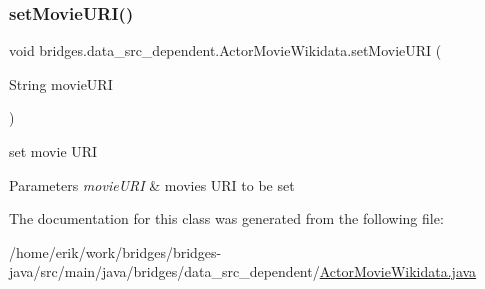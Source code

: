 \subsubsection{\texorpdfstring{set\+Movie\+U\+R\+I()}{setMovieURI()}}
{\footnotesize\ttfamily void bridges.\+data\+\_\+src\+\_\+dependent.\+Actor\+Movie\+Wikidata.\+set\+Movie\+U\+RI (\begin{DoxyParamCaption}\item[{String}]{movie\+U\+RI }\end{DoxyParamCaption})}



set movie U\+RI 


\begin{DoxyParams}{Parameters}
{\em movie\+U\+RI} & movie\textquotesingle{}s U\+RI to be set \\
\hline
\end{DoxyParams}


The documentation for this class was generated from the following file\+:\begin{DoxyCompactItemize}
\item 
/home/erik/work/bridges/bridges-\/java/src/main/java/bridges/data\+\_\+src\+\_\+dependent/\hyperlink{_actor_movie_wikidata_8java}{Actor\+Movie\+Wikidata.\+java}\end{DoxyCompactItemize}

